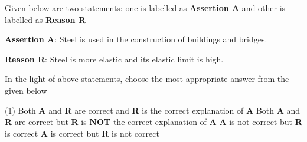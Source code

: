 \item Given below are two statements: one is labelled as \textbf{Assertion A} and other is labelled as \textbf{Reason R}
    
    \textbf{Assertion A}: Steel is used in the construction of buildings and bridges.
    
    \textbf{Reason R}: Steel is more elastic and its elastic limit is high.
    
    In the light of above statements, choose the most appropriate answer from the given below
    \begin{tasks}(1)
        \task Both \textbf{A} and \textbf{R} are correct and \textbf{R} is the correct explanation of \textbf{A}
        \task Both \textbf{A} and \textbf{R} are correct but \textbf{R} is \textbf{NOT} the correct explanation of \textbf{A}
        \task \textbf{A} is not correct but \textbf{R} is correct
        \task \textbf{A} is correct but \textbf{R} is not correct
    \end{tasks}